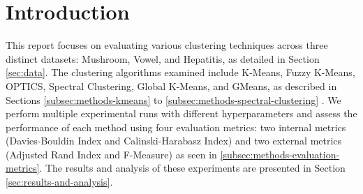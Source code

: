 \section{Introduction}
\label{sec:introduction}


This report focuses on evaluating various clustering techniques across three distinct datasets: Mushroom, Vowel, and Hepatitis, as detailed in Section \ref{sec:data}. The clustering algorithms examined include K-Means, Fuzzy K-Means, OPTICS, Spectral Clustering, Global K-Means, and GMeans, as described in Sections \ref{subsec:methods-kmeans} to \ref{subsec:methods-spectral-clustering} . We perform multiple experimental runs with different hyperparameters and assess the performance of each method using four evaluation metrics: two internal metrics (Davies-Bouldin Index and Calinski-Harabasz Index) and two external metrics (Adjusted Rand Index and F-Measure) as seen in \ref{subsec:methods-evaluation-metrics}. The results and analysis of these experiments are presented in Section \ref{sec:results-and-analysis}.
